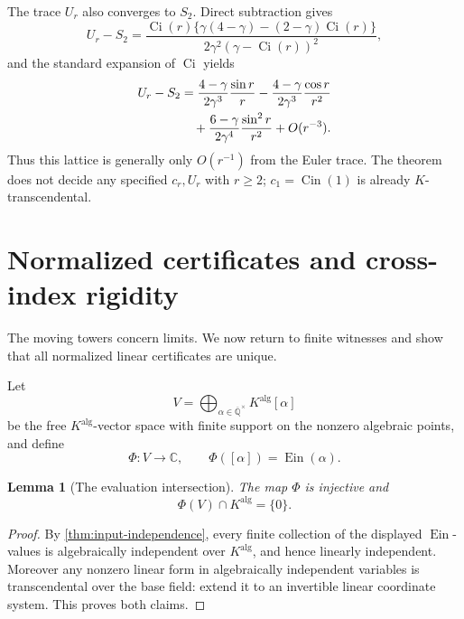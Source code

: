 \documentclass[11pt]{article}
\newtheorem{lemma}[theorem]{Lemma}
\theoremstyle{definition}
\theoremstyle{remark}
\newcommand{\Qbar}{\overline{\mathbb Q}}
\newcommand{\C}{\mathbb C}
\newcommand{\Ein}{\operatorname{Ein}}
\newcommand{\Cin}{\operatorname{Cin}}
\newcommand{\Ci}{\operatorname{Ci}}
\begin{document}
The trace \(U_r\) also converges to \(S_2\).  Direct subtraction gives
\begin{equation}\label{eq:Ur-S2-exact}
 U_r-S_2=
 \frac{\Ci(r)\{\gamma(4-\gamma)-(2-\gamma)\Ci(r)\}}
 {2\gamma^2(\gamma-\Ci(r))^2},
\end{equation}
and the standard expansion of \(\Ci\) yields
\begin{align}
 U_r-S_2
 &=\frac{4-\gamma}{2\gamma^3}\frac{\sin r}{r}
 -\frac{4-\gamma}{2\gamma^3}\frac{\cos r}{r^2}\notag\\
 &\quad+
 \frac{6-\gamma}{2\gamma^4}\frac{\sin^2r}{r^2}
 +O(r^{-3}).\label{eq:Ur-S2-asymptotic}
\end{align}
Thus this lattice is generally only \(O(r^{-1})\) from the Euler trace.
The theorem does not decide any specified \(c_r,U_r\) with \(r\ge2\);
\(c_1=\Cin(1)\) is already \(K\)-transcendental.

\section{Normalized certificates and cross-index rigidity}
\label{sec:certificates}

The moving towers concern limits.  We now return to finite witnesses and
show that all normalized linear certificates are unique.

Let
\[
 V=\bigoplus_{\alpha\in\Qbar^\times}K^{\mathrm{alg}}[\alpha]
\]
be the free \(K^{\mathrm{alg}}\)-vector space with finite support on the
nonzero algebraic points, and define
\[
 \Phi:V\longrightarrow\C,
 \qquad \Phi([\alpha])=\Ein(\alpha).
\]

\begin{lemma}[The evaluation intersection]
\label{lem:evaluation-intersection}
The map \(\Phi\) is injective and
\begin{equation}\label{eq:Phi-intersection}
 \Phi(V)\cap K^{\mathrm{alg}}=\{0\}.
\end{equation}
\end{lemma}

\begin{proof}
By \cref{thm:input-independence}, every finite collection of the displayed
\(\Ein\)-values is algebraically independent over \(K^{\mathrm{alg}}\), and
hence linearly independent.  Moreover any nonzero linear form in
algebraically independent variables is transcendental over the base field:
extend it to an invertible linear coordinate system.  This proves both
claims.
\end{proof}
\end{document}
